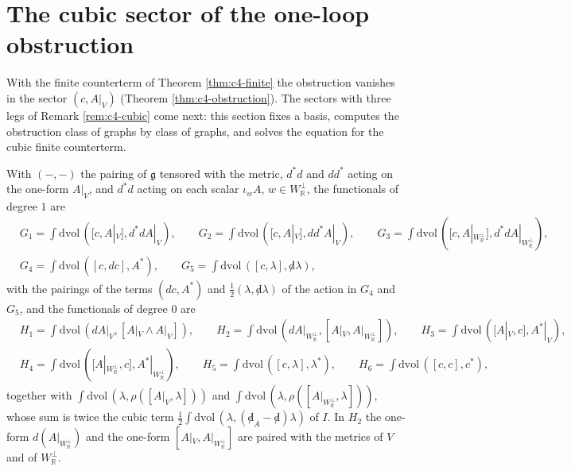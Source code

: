 \section{The cubic sector of the one-loop obstruction}

With the finite counterterm of Theorem \ref{thm:c4-finite} the obstruction vanishes in the sector $(c,A|_V)$ (Theorem \ref{thm:c4-obstruction}). The sectors with three legs of Remark \ref{rem:c4-cubic} come next: this section fixes a basis, computes the obstruction class of graphs by class of graphs, and solves the equation for the cubic finite counterterm.

\begin{definition}
\label{def:c9-bases}
With $(-,-)$ the pairing of $\mathfrak g$ tensored with the metric, $d^*d$ and $dd^*$ acting on the one-form $A|_V$, and $d^*d$ acting on each scalar $\iota_wA$, $w\in W_{\mathbb R}^\perp$, the functionals of degree $1$ are
\[
\begin{aligned}
&G_1=\int\mathrm{dvol}\,([c,A|_V],d^*dA|_V),\qquad G_2=\int\mathrm{dvol}\,([c,A|_V],dd^*A|_V),\qquad G_3=\int\mathrm{dvol}\,([c,A|_{W_{\mathbb R}^\perp}],d^*dA|_{W_{\mathbb R}^\perp}),\\
&G_4=\int\mathrm{dvol}\,([c,dc],A^*),\qquad G_5=\int\mathrm{dvol}\,([c,\lambda],{\not d}\lambda),
\end{aligned}
\]
with the pairings of the terms $(dc,A^*)$ and $\tfrac12(\lambda,{\not d}\lambda)$ of the action in $G_4$ and $G_5$, and the functionals of degree $0$ are
\[
\begin{aligned}
&H_1=\int\mathrm{dvol}\,(dA|_V,[A|_V\wedge A|_V]),\qquad H_2=\int\mathrm{dvol}\,(dA|_{W_{\mathbb R}^\perp},[A|_V,A|_{W_{\mathbb R}^\perp}]),\qquad H_3=\int\mathrm{dvol}\,([A|_V,c],A^*|_V),\\
&H_4=\int\mathrm{dvol}\,([A|_{W_{\mathbb R}^\perp},c],A^*|_{W_{\mathbb R}^\perp}),\qquad H_5=\int\mathrm{dvol}\,([c,\lambda],\lambda^*),\qquad H_6=\int\mathrm{dvol}\,([c,c],c^*),
\end{aligned}
\]
together with $\int\mathrm{dvol}\,(\lambda,\rho([A|_V,\lambda]))$ and $\int\mathrm{dvol}\,(\lambda,\rho([A|_{W_{\mathbb R}^\perp},\lambda]))$, whose sum is twice the cubic term $\tfrac12\int\mathrm{dvol}\,(\lambda,({\not d}_A-{\not d})\lambda)$ of $I$. In $H_2$ the one-form $d(A|_{W_{\mathbb R}^\perp})$ and the one-form $[A|_V,A|_{W_{\mathbb R}^\perp}]$ are paired with the metrics of $V$ and of $W_{\mathbb R}^\perp$.
\end{definition}

